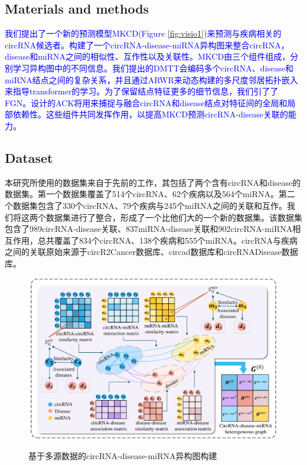 \documentclass{bioinfo}
\begin{document}
\begin{methods}
\section{Materials and methods}

\textcolor{blue}{我们提出了一个新的预测模型MKCD(Figure \ref{fig:visio1})来预测与疾病相关的circRNA候选者。构建了一个circRNA-disease-miRNA异构图来整合circRNA，disease和miRNA之间的相似性、互作性以及关联性。MKCD由三个组件组成，分别学习异构图中的不同信息。我们提出的DMTT会编码多个circRNA、disease和miRNA结点之间的复杂关系，并且通过ARWR来动态构建的多尺度邻居拓扑嵌入来指导transformer的学习。为了保留结点特征更多的细节信息，我们引了了FGN。设计的ACK将用来捕捉与融合circRNA和disease结点对特征间的全局和局部依赖性。这些组件共同发挥作用，以提高MKCD预测circRNA-disease关联的能力。}


\subsection{Dataset}

本研究所使用的数据集来自于先前的工作\cite{lan2022kgancda}，其包括了两个含有circRNA和disease的数据集。第一个数据集覆盖了514个circRNA、62个疾病以及564个miRNA。第二个数据集包含了330个circRNA、79个疾病与245个miRNA之间的关联和互作。我们将这两个数据集进行了整合，形成了一个比他们大的一个新的数据集。该数据集包含了989circRNA-disease关联、837miRNA-disease关联和902circRNA-miRNA相互作用，总共覆盖了834个circRNA、138个疾病和555个miRNA。circRNA与疾病之间的关联原始来源于circR2Cancer数据库\cite{lan2020circr2cancer}、circad数据库\cite{rophina2020circad}和circRNADisease数据库\cite{zhao2018circrna}。

\begin{figure}[t]
	\centering
	\includegraphics[width=7in]{fig/visio2.pdf}\\
	\vspace{0.2cm}
	\caption{基于多源数据的circRNA-disease-miRNA异构图构建}
	\label{fig:visio2}
	\vspace{0.1cm}
\end{figure}


\end{methods}
\end{document}
